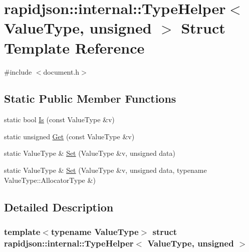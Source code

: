 \hypertarget{structrapidjson_1_1internal_1_1_type_helper_3_01_value_type_00_01unsigned_01_4}{}\section{rapidjson\+::internal\+::Type\+Helper$<$ Value\+Type, unsigned $>$ Struct Template Reference}
\label{structrapidjson_1_1internal_1_1_type_helper_3_01_value_type_00_01unsigned_01_4}


{\ttfamily \#include $<$document.\+h$>$}

\subsection*{Static Public Member Functions}
\begin{DoxyCompactItemize}
\item 
static bool \mbox{\hyperlink{structrapidjson_1_1internal_1_1_type_helper_3_01_value_type_00_01unsigned_01_4_a53c6c0255d1c31f244fd10bad39fc06c}{Is}} (const Value\+Type \&v)
\item 
static unsigned \mbox{\hyperlink{structrapidjson_1_1internal_1_1_type_helper_3_01_value_type_00_01unsigned_01_4_a2f0943339b32d24609226023515daffc}{Get}} (const Value\+Type \&v)
\item 
static Value\+Type \& \mbox{\hyperlink{structrapidjson_1_1internal_1_1_type_helper_3_01_value_type_00_01unsigned_01_4_a3cc029a3c205f00f62e20fd3cb8f1321}{Set}} (Value\+Type \&v, unsigned data)
\item 
static Value\+Type \& \mbox{\hyperlink{structrapidjson_1_1internal_1_1_type_helper_3_01_value_type_00_01unsigned_01_4_a98a525bf701d284915de8ab65cbc51e6}{Set}} (Value\+Type \&v, unsigned data, typename Value\+Type\+::\+Allocator\+Type \&)
\end{DoxyCompactItemize}


\subsection{Detailed Description}
\subsubsection*{template$<$typename Value\+Type$>$\newline
struct rapidjson\+::internal\+::\+Type\+Helper$<$ Value\+Type, unsigned $>$}




